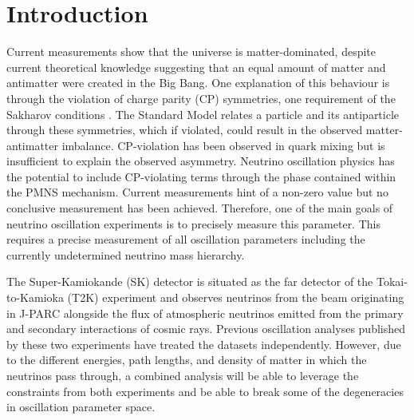 \chapter{Introduction}
\label{chap:Introduction}

Current measurements show that the universe is matter-dominated, despite current theoretical knowledge suggesting that an equal amount of matter and antimatter were created in the Big Bang. One explanation of this behaviour is through the violation of charge parity (CP) symmetries, one requirement of the Sakharov conditions \cite{Sakharov1991}. The Standard Model relates a particle and its antiparticle through these symmetries, which if violated, could result in the observed matter-antimatter imbalance. CP-violation has been observed in quark mixing but is insufficient to explain the observed asymmetry. Neutrino oscillation physics has the potential to include CP-violating terms through the  phase contained within the PMNS mechanism. Current measurements hint of a non-zero value \cite{Dunne2020-uf} but no conclusive measurement has been achieved. Therefore, one of the main goals of neutrino oscillation experiments is to precisely measure this parameter. This requires a precise measurement of all oscillation parameters including the currently undetermined neutrino mass hierarchy.

The Super-Kamiokande (SK) detector is situated as the far detector of the Tokai-to-Kamioka (T2K) experiment and observes neutrinos from the beam originating in J-PARC alongside the flux of atmospheric neutrinos emitted from the primary and secondary interactions of cosmic rays. Previous oscillation analyses published by these two experiments have treated the datasets independently. However, due to the different energies, path lengths, and density of matter in which the neutrinos pass through, a combined analysis will be able to leverage the constraints from both experiments and be able to break some of the degeneracies in oscillation parameter space.


